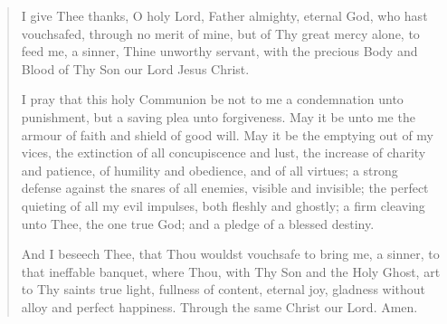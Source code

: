 \begin{quote}



I give Thee thanks, O holy Lord, Father almighty, eternal God, who hast vouchsafed, through no merit of mine, but of Thy great mercy alone, to feed me, a sinner, 
Thine unworthy servant, with the precious Body and Blood of
  Thy Son our Lord Jesus Christ. 

I pray that this holy Communion be not to me a condemnation unto punishment, but a saving
  plea unto forgiveness. May it be unto me the armour of faith and shield of good will. May it be the emptying out of my
  vices, the extinction of all concupiscence and lust, the increase of charity and patience, of humility and obedience, and    
  of all virtues; a strong defense against the snares of all enemies, visible and invisible; the perfect quieting of all my
  evil impulses, both fleshly and ghostly; a firm cleaving unto Thee, the one true God; and a pledge of a blessed destiny.
  
And I beseech Thee, that Thou wouldst vouchsafe to bring me, a sinner, to that ineffable banquet, where Thou, with Thy Son
  and the Holy Ghost, art to Thy saints true light, fullness of content, eternal joy, gladness without alloy and perfect
  happiness. Through the same Christ our Lord. Amen.



\end{quote}

\eject

